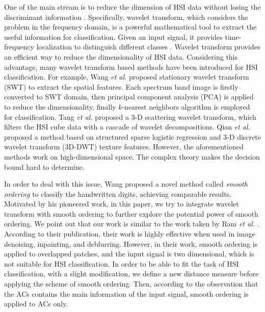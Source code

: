 \documentclass{ws-ijwmip}
\begin{document}
One of the main stream is to reduce the dimension of HSI data without losing the discriminant information \cite{10,11,12}.
Specifically, wavelet transform, which considers the problem in the frequency domain, is a powerful mathematical tool to extract the useful information for classification. 
Given an input signal, it provides time-frequency localization to distinguish different classes \cite{nayak2016brain}.
Wavelet transform provides an efficient way to reduce the dimensionality of HSI data.
Considering this advantage, 
many wavelet transform based methods have been introduced for HSI classification. For example, Wang {\it et al.} \cite{22} proposed stationary wavelet transform (SWT) to extract the spatial features. 
Each spectrum band image is firstly converted to SWT domain, then principal component analysis (PCA) is applied to reduce the dimensionality, finally $k$-nearest neighbors algorithm is employed for classification. 
Tang {\it et al.} \cite{24} proposed a 3-D scattering wavelet transform, which filters the HSI cube data with a cascade of wavelet decompositions\cite{25}.
Qian {\it et al.} \cite{29} proposed a method based on structured sparse logistic regression and 3-D discrete wavelet transform (3D-DWT) texture features.
However, the aforementioned methods work on high-dimensional space.
The complex theory makes the decision bound hard to determine.

In order to deal with this issue, Wang \cite{34} proposed a novel method called \emph{smooth ordering} to classify the handwritten digits, achieving comparable results.
Motivated by his pioneered work, in this paper, we try to integrate wavelet transform with smooth ordering to further explore the potential power of smooth ordering.
We point out that our work is similar to the work taken by Ram {\it et al.} \cite{30}. 
According to their publication, their work is highly effective when used in image denoising, inpainting, and deblurring. However, in their work, smooth ordering is applied to overlapped patches, and the input signal is two dimensional, which is not suitable for HSI classification. In order to be able to fit the task of HSI classification, with a slight modification, 
we define a new distance measure before applying the scheme of smooth ordering. 
Then, according to the observation that the ACs contains the main information of the input signal, smooth ordering is applied to ACs only. 
\end{document}
